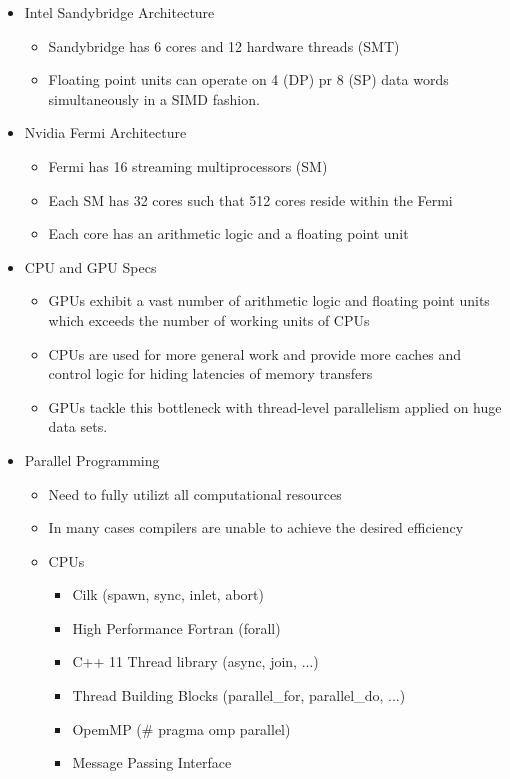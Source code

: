 \documentclass[paper=a4, fontsize=11pt]{scrartcl} %
\numberwithin{equation}{section} %
\numberwithin{figure}{section} %
\numberwithin{table}{section} %
\begin{document}
\begin{itemize}
  \item Intel Sandybridge Architecture
  \begin{itemize}
    \item Sandybridge has 6 cores and 12 hardware threads (SMT)
    \item Floating point units can operate on 4 (DP) pr 8 (SP) data words simultaneously in a SIMD fashion.
  \end{itemize}
  \item Nvidia Fermi Architecture
  \begin{itemize}
    \item Fermi has 16 streaming multiprocessors (SM)
    \item Each SM has 32 cores such that 512 cores reside within the Fermi
    \item Each core has an arithmetic logic and a floating point unit
  \end{itemize}
  \item CPU and GPU Specs
  \begin{itemize}
    \item GPUs exhibit a vast number of arithmetic logic and floating point units which exceeds the number of working units of CPUs
    \item CPUs are used for more general work and provide more caches and control logic for hiding latencies of memory transfers
    \item GPUs tackle this bottleneck with thread-level parallelism applied on huge data sets.
  \end{itemize}
  \item Parallel Programming
  \begin{itemize}
    \item Need to fully utilizt all computational resources
    \item In many cases compilers are unable to achieve the desired efficiency
    \item CPUs
    \begin{itemize}
      \item Cilk (spawn, sync, inlet, abort)
      \item High Performance Fortran (forall)
      \item C++ 11 Thread library (async, join, ...)
      \item Thread Building Blocks (parallel_for, parallel_do, ...)
      \item OpemMP (# pragma omp parallel)
      \item Message Passing Interface

\end{itemize}
\end{itemize}
\end{itemize}
\end{document}
